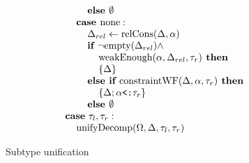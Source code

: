 \documentclass[acmsmall]{acmart}
\begin{document}
\begin{figure*}[h]
\[\begin{array}[t]{@{} l}
  \\
  \I\I\I \B{else } \emptyset 
  \\
  \I\I \B{case } \F{none} :
  \\
  \I\I\I \Delta_{rel} \leftarrow \F{relCons}(\Delta, \alpha)  
  \\
  \I\I\I \B{if } \neg \F{empty}(\Delta_{rel}) \wedge 
  \\
  \I\I\I\I \F{weakEnough}(\alpha, \Delta_{rel}, \tau_r) \B{ then }
  \\
  \I\I\I\I \{\Delta\}
  \\
  \I\I\I \B{else if } \F{constraintWF}(\Delta, \alpha, \tau_r) \B{ then }
  \\
  \I\I\I\I \{\Delta;\code{$\alpha$<:$\tau_r$}\}
  \\
  \I\I\I \B{else } \emptyset 

  \\

  \I \B{case}\ \tau_{l}, \tau_{r}:
  \\
  \I\I \F{unifyDecomp}(\Omega, \Delta, \tau_{l}, \tau_{r})
\end{array}
\]

\caption{Subtype unification}
\label{fig:unify}
\end{figure*}
\end{document}
